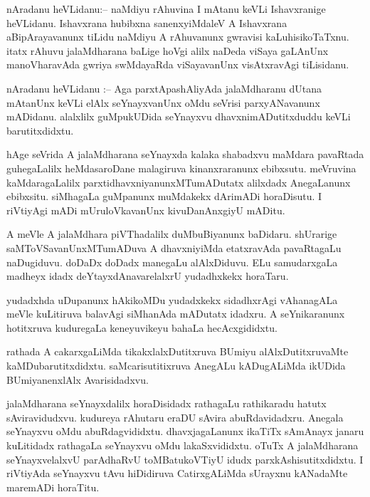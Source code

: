 \documentclass{article}
\begin{document}
\begin{mn}%
nAradanu heVLidanu:-- naMdiyu rAhuvina I mAtanu keVLi Ishavxranige heVLidanu. Ishavxrana 
hubibxna sanenxyiMdaleV A Ishavxrana aBipArayavanunx tiLidu naMdiyu A rAhuvanunx gwravisi 
kaLuhisikoTaTxnu. itatx rAhuvu jalaMdharana baLige hoVgi alilx naDeda viSaya gaLAnUnx 
manoVharavAda gwriya swMdayaRda viSayavanUnx visAtxravAgi tiLisidanu.
\end{mn}


\begin{mn}%
nAradanu heVLidanu :-- Aga parxtApashAliyAda jalaMdharanu dUtana mAtanUnx keVLi elAlx 
seYnayxvanUnx oMdu seVrisi parxyANavanunx mADidanu. alalxlilx guMpukUDida seYnayxvu 
dhavxnimADutitxduddu keVLi barutitxdidxtu.
\end{mn}

\begin{mn}%
hAge seVrida A jalaMdharana seYnayxda kalaka shabadxvu maMdara pavaRtada guhegaLalilx 
heMdasaroDane malagiruva kinanxraranunx ebibxsutu. meVruvina kaMdaragaLalilx 
parxtidhavxniyanunxMTumADutatx alilxdadx AnegaLanunx ebibxsitu. siMhagaLa guMpanunx 
muMdakekx dArimADi horaDisutu. I riVtiyAgi mADi mUruloVkavanUnx kivuDanAnxgiyU mADitu.
\end{mn}


\begin{mn}%
A meVle A jalaMdhara piVThadalilx duMbuBiyanunx baDidaru. shUrarige saMToVSavanUnxMTumADuva 
A dhavxniyiMda etatxravAda pavaRtagaLu naDugiduvu. doDaDx doDadx manegaLu alAlxDiduvu. ELu 
samudarxgaLa madheyx idadx deYtayxdAnavarelalxrU yudadhxkekx horaTaru.
\end{mn}

\begin{mn}%
yudadxhda uDupanunx hAkikoMDu yudadxkekx sidadhxrAgi vAhanagALa meVle kuLitiruva balavAgi 
siMhanAda mADutatx idadxru. A seYnikaranunx hotitxruva kuduregaLa keneyuvikeyu bahaLa 
hecAcxgididxtu.
\end{mn}

\begin{mn}%
rathada A cakarxgaLiMda tikakxlalxDutitxruva BUmiyu alAlxDutitxruvaMte kaMDubarutitxdidxtu. 
saMcarisutitixruva AnegALu kADugALiMda ikUDida BUmiyanenxlAlx Avarisidadxvu.
\end{mn}

\begin{mn}%
jalaMdharana seYnayxdalilx horaDisidadx rathagaLu rathikaradu hatutx sAviravidudxvu. 
kudureya rAhutaru eraDU sAvira abuRdavidadxru. Anegala seYnayxvu oMdu abuRdagvididxtu. 
dhavxjagaLanunx ikaTiTx sAmAnayx janaru kuLitidadx rathagaLa seYnayxvu oMdu lakaSxvididxtu. 
oTuTx A jalaMdharana seYnayxvelalxvU parAdhaRvU toMBatukoVTiyU idudx parxkAshisutitxdidxtu. 
I riVtiyAda seYnayxvu tAvu hiDidiruva CatirxgALiMda sUrayxnu kANadaMte maremADi horaTitu.
\end{mn}
\end{document}
